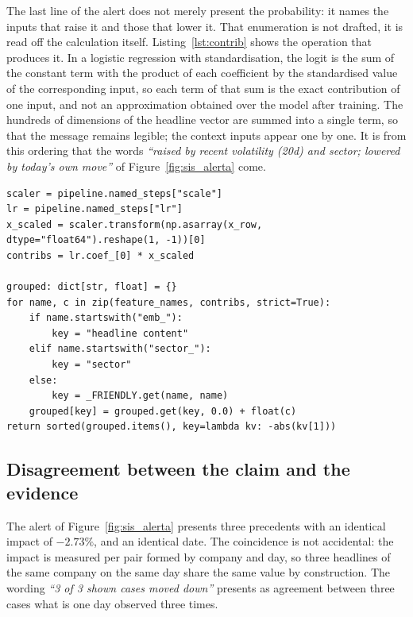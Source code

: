 The last line of the alert does not merely present the probability: it names the inputs that
raise it and those that lower it. That enumeration is not drafted, it is read off the calculation
itself. Listing~\ref{lst:contrib} shows the operation that produces it. In a logistic regression
with standardisation, the logit is the sum of the constant term with the product of each
coefficient by the standardised value of the corresponding input, so each term of that sum is the
exact contribution of one input, and not an approximation obtained over the model after training.
The hundreds of dimensions of the headline vector are summed into a single term, so that the
message remains legible; the context inputs appear one by one. It is from this ordering that the
words \emph{``raised by recent volatility (20d) and sector; lowered by today's own move''} of
Figure~\ref{fig:sis_alerta} come.

\begin{lstlisting}[caption={[The additive decomposition the message states]The decomposition that
the last line of the alert states. The product of the coefficient vector by the standardised
vector gives the contribution of each input to the logit; the terms are grouped and ordered by
decreasing magnitude. The explanation presented to the user is this sum, and not a second model
fitted over the first. The internal documentation of the function is omitted.},
label={lst:contrib}, float=htbp]
scaler = pipeline.named_steps["scale"]
lr = pipeline.named_steps["lr"]
x_scaled = scaler.transform(np.asarray(x_row, dtype="float64").reshape(1, -1))[0]
contribs = lr.coef_[0] * x_scaled

grouped: dict[str, float] = {}
for name, c in zip(feature_names, contribs, strict=True):
    if name.startswith("emb_"):
        key = "headline content"
    elif name.startswith("sector_"):
        key = "sector"
    else:
        key = _FRIENDLY.get(name, name)
    grouped[key] = grouped.get(key, 0.0) + float(c)
return sorted(grouped.items(), key=lambda kv: -abs(kv[1]))
\end{lstlisting}

\subsection{Disagreement between the claim and the evidence}

The alert of Figure~\ref{fig:sis_alerta} presents three precedents with an identical impact of
$-2.73\%$, and an identical date. The coincidence is not accidental: the impact is measured per
pair formed by company and day, so three headlines of the same company on the same day share the
same value by construction. The wording \emph{``3 of 3 shown cases moved down''} presents as
agreement between three cases what is one day observed three times.

